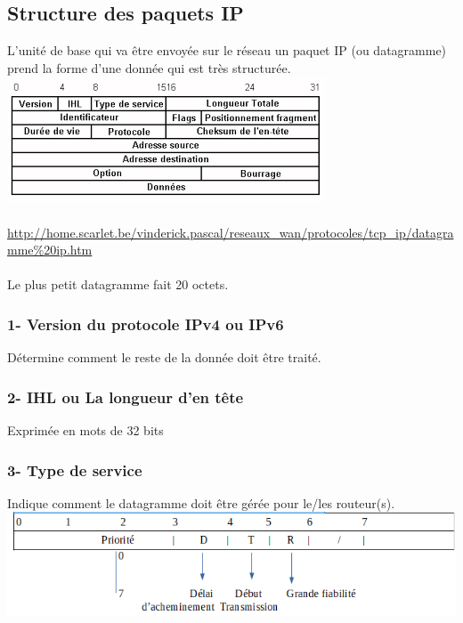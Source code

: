 \documentclass{article}
\begin{document}
\subsection{Structure des paquets IP}
L’unité de base qui va être envoyée sur le réseau un paquet IP (ou datagramme) prend la forme d’une donnée qui est très structurée. \\

\includegraphics{image/data_ip.png} \\
\\
\url{http://home.scarlet.be/vinderick.pascal/reseaux_wan/protocoles/tcp_ip/datagramme%20ip.htm} \\
\\ 
Le plus petit datagramme fait 20 octets. \\

\subsubsection*{1- Version du protocole IPv4 ou IPv6}
Détermine comment le reste de la donnée doit être traité. \\

\subsubsection*{2- IHL ou La longueur d’en tête}
Exprimée en mots de 32 bits

\subsubsection*{3- Type de service}
Indique comment le datagramme doit être gérée pour le/les routeur(s). \\
\includegraphics{image/Type.PNG}
\end{document}
